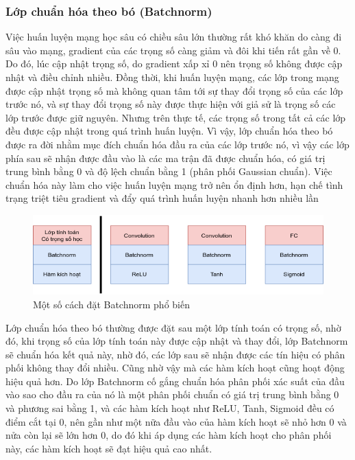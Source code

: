 \subsubsection{Lớp chuẩn hóa theo bó (Batchnorm)}

Việc huấn luyện mạng học sâu có chiều sâu lớn thường rất khó khăn do càng đi sâu vào mạng, gradient của các trọng số càng giảm và đôi khi tiến rất gần về 0. Do đó, lúc cập nhật trọng số, do gradient xấp xỉ 0 nên trọng số không được cập nhật và điều chỉnh nhiều. Đồng thời, khi huấn luyện mạng, các lớp trong mạng được cập nhật trọng số mà không quan tâm tới sự thay đổi trọng số của các lớp trước nó, và sự thay đổi trọng số này được thực hiện với giả sử là trọng số các lớp trước được giữ nguyên. Nhưng trên thực tế, các trọng số trong tất cả các lớp đều được cập nhật trong quá trình huấn luyện. Vì vậy, lớp chuẩn hóa theo bó được ra đời nhằm mục đích chuẩn hóa đầu ra của các lớp trước nó, vì vậy các lớp phía sau sẽ nhận được đầu vào là các ma trận đã được chuẩn hóa, có giá trị trung bình bằng 0 và độ lệch chuẩn bằng 1 (phân phối Gaussian chuẩn). Việc chuẩn hóa này làm cho việc huấn luyện mạng trở nên ổn định hơn, hạn chế tình trạng triệt tiêu gradient và đẩy quá trình huấn luyện nhanh hơn nhiều lần

\begin{figure}[H]
    \centering
    \includegraphics[width=13cm]{./content/materials/batchnorm.png}
    \caption{Một số cách đặt Batchnorm phổ biến}
\end{figure}

Lớp chuẩn hóa theo bó thường được đặt sau một lớp tính toán có trọng số, nhờ đó, khi trọng số của lớp tính toán này được cập nhật và thay đổi, lớp Batchnorm sẽ chuẩn hóa kết quả này, nhờ đó, các lớp sau sẽ nhận được các tín hiệu có phân phối không thay đổi nhiều. Cũng nhờ vậy mà các hàm kích hoạt cũng hoạt động hiệu quả hơn. Do lớp Batchnorm cố gắng chuẩn hóa phân phối xác suất của đầu vào sao cho đầu ra của nó là một phân phối chuẩn có giá trị trung bình bằng 0 và phương sai bằng 1, và các hàm kích hoạt như ReLU, Tanh, Sigmoid đều có điểm cắt tại 0, nên gần như một nữa đầu vào của hàm kích hoạt sẽ nhỏ hơn 0 và nửa còn lại sẽ lớn hơn 0, do đó khi áp dụng các hàm kích hoạt cho phân phối này, các hàm kích hoạt sẽ đạt hiệu quả cao nhất.


